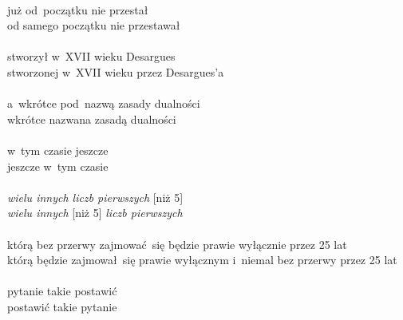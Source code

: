 \documentclass[a4paper,11pt]{article}
\begin{document}
\noindent
{} \\
\Jest  już od~początku nie przestał  \\
\Powin od samego początku nie przestawał \\
 \\
\Jest  stworzył w~XVII wieku Desargues \\
\Powin stworzonej w~XVII wieku przez Desargues'a \\
 \\
\Jest  a~wkrótce pod~nazwą zasady dualności \\
\Powin wkrótce nazwana zasadą dualności \\
 \\
\Jest  w~tym czasie jeszcze \\
\Powin jeszcze w~tym czasie \\
 \\
\Jest  \textit{wielu innych liczb pierwszych} [niż 5] \\
\Powin \textit{wielu innych} [niż 5] \textit{liczb pierwszych} \\
 \\
\Jest  którą bez przerwy zajmować~się będzie prawie wyłącznie przez 25 lat \\
\Powin którą będzie zajmował~się prawie wyłącznym i~niemal bez przerwy
przez 25 lat \\
 \\
\Jest  pytanie takie postawić \\
\Powin postawić takie pytanie \\
















\end{document}
